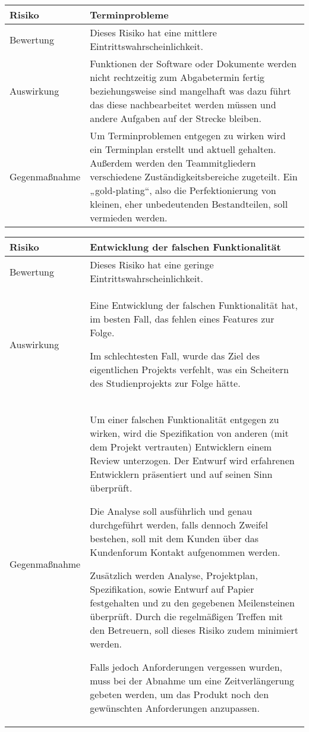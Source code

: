 \begin{center}
	\begin{tabular}{| p{3cm} | p{12cm} |}
		\hline
		Risiko & Terminprobleme \\ \hline
		
		Bewertung & Dieses Risiko hat eine mittlere Eintrittswahrscheinlichkeit. \\ \hline
		
		Auswirkung & Funktionen der Software oder Dokumente werden nicht rechtzeitig zum Abgabetermin fertig beziehungsweise sind mangelhaft was dazu führt das diese nachbearbeitet werden müssen und andere Aufgaben auf der Strecke bleiben. \\ \hline
		
		Gegenmaßnahme & Um Terminproblemen entgegen zu wirken wird ein Terminplan erstellt und aktuell gehalten.
		Außerdem werden den Teammitgliedern verschiedene Zuständigkeitsbereiche zugeteilt.
		Ein „gold-plating“, also die Perfektionierung von kleinen, eher unbedeutenden Bestandteilen, soll vermieden werden. \\
		\hline
	\end{tabular}
\end{center}

\begin{center}
	\begin{tabular}{| p{3cm} | p{12cm} |}
		\hline
		Risiko & Entwicklung der falschen Funktionalität \\ \hline
		
		Bewertung & Dieses Risiko hat eine geringe Eintrittswahrscheinlichkeit. \\ \hline
		
		Auswirkung & Eine Entwicklung der falschen Funktionalität hat, im besten Fall, das fehlen eines Features zur Folge.
			
		Im schlechtesten Fall, wurde das Ziel des eigentlichen Projekts verfehlt, was ein Scheitern des Studienprojekts zur Folge hätte. \\ \hline
		
		Gegenmaßnahme & Um einer falschen Funktionalität entgegen zu wirken, wird die Spezifikation von anderen (mit dem Projekt vertrauten) Entwicklern einem Review unterzogen.
		Der Entwurf wird erfahrenen Entwicklern präsentiert und auf seinen Sinn überprüft.
		
		Die Analyse soll ausführlich und genau durchgeführt werden, falls dennoch Zweifel bestehen, soll mit dem Kunden über das Kundenforum Kontakt aufgenommen werden.
		
		Zusätzlich werden Analyse, Projektplan, Spezifikation, sowie Entwurf auf Papier festgehalten und zu den gegebenen Meilensteinen überprüft.
		Durch die regelmäßigen Treffen mit den Betreuern, soll dieses Risiko zudem minimiert werden.
		
		Falls jedoch Anforderungen vergessen wurden, muss bei der Abnahme um eine Zeitverlängerung gebeten werden, um das Produkt noch den gewünschten Anforderungen anzupassen. \\
		\hline
	\end{tabular}
\end{center}

